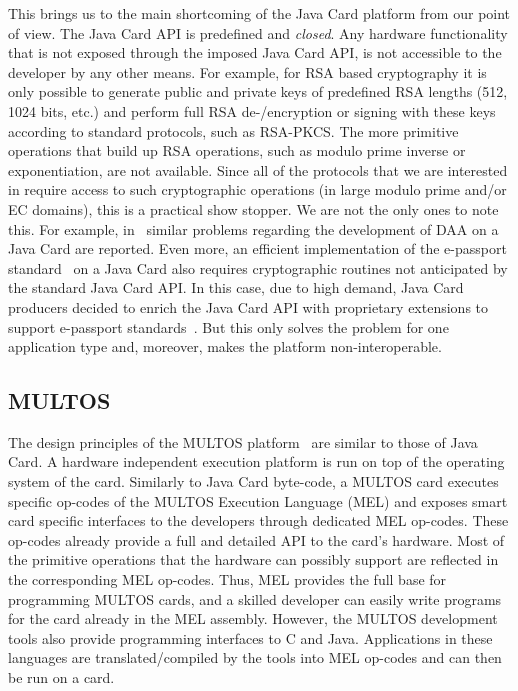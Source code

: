 This brings us to the main shortcoming of the Java Card platform from our
point of view. The Java Card API is predefined
and \emph{closed}. Any hardware functionality that is not exposed
through the imposed Java Card API, is not accessible to the developer
by any other means. For example, for RSA based cryptography it is only
possible to generate public and private keys of predefined RSA lengths
(512, 1024 bits, etc.) and perform full RSA de-/encryption or signing
with these keys according to standard protocols, such as RSA-PKCS.  The
more primitive operations that build up RSA operations, such as modulo
prime inverse or exponentiation, are not available. Since all of the
protocols that we are interested in require access to such cryptographic operations
(in large modulo prime and/or EC domains), this is a practical show
stopper. We are not the only ones to note this. For example,
in~\cite{Sterckx09}
similar problems regarding the development of DAA on a Java Card are
reported.  Even more, an efficient implementation of the e-passport
standard~\cite{EAC20} on a Java Card also requires cryptographic
routines not anticipated by the standard Java Card API. In this case,
due to high demand, Java Card producers decided to enrich the Java
Card API with proprietary extensions to support e-passport
standards~\cite{NXP09}. But this only solves the problem for one
application type and, moreover, makes the platform non-interoperable.

\subsection{MULTOS}\label{sec:multos}

The design principles of the MULTOS
platform~\cite{MULTOS2005,MULTOS_Manual2009} are similar to those of
Java Card. A hardware independent execution platform is run on top of
the operating system of the card. Similarly to Java Card byte-code, a
MULTOS card executes specific op-codes of the MULTOS Execution
Language (MEL) and exposes smart card specific interfaces to the
developers through dedicated MEL op-codes. These
op-codes already provide a full and detailed API to the card's
hardware. Most of the primitive operations that the hardware can
possibly support are reflected in the corresponding MEL
op-codes. Thus, MEL provides the full base for programming MULTOS
cards, and a skilled developer can easily write programs for the
card already in the MEL assembly. However, the MULTOS development
tools also provide programming interfaces to C and Java. Applications
in these languages are translated\slash compiled by the tools into MEL op-codes and
can then be run on a card.

